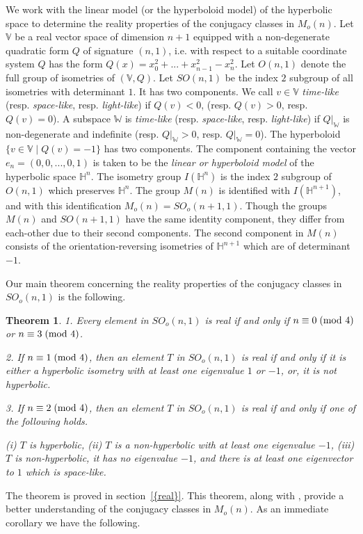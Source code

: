 \documentclass[11pt]{amsart}
\newtheorem{theorem}{Theorem}[section]
\theoremstyle{definition}
\theoremstyle{remark}
\numberwithin{equation}{section}
\theoremstyle{plain}
\begin{document}
We work with the linear model (or the hyperboloid model) of the hyperbolic space to determine the reality properties of the conjugacy classes in $M_o(n)$. Let ${\mathbb V}$ be a real vector space of dimension $n+1$ equipped with a non-degenerate quadratic form $Q$ of signature $(n,1)$, i.e. with respect to a suitable coordinate system $Q$ has the form {$Q(x)=x_0^2 +...+x_{n-1}^2-x_{n}^2$}.  Let $O(n,1)$ denote the full group of isometries of $({\mathbb V},Q)$. Let $SO(n,1)$ be the index $2$ subgroup of all isometries with determinant $1$. It has two components. We call  $v \in {\mathbb V}$ {\it time-like} (resp. {\it space-like}, resp. {\it light-like}) if
$Q(v) < 0$, (resp. $Q(v) >  0$, resp. $Q(v) = 0$). A subspace ${\mathbb W}$ is  {\it time-like} (resp. {\it space-like}, resp. {\it light-like}) if $Q|_{\mathbb W}$ is non-degenerate and   indefinite (resp. $Q|_{\mathbb W} > 0$, resp. $Q|_{\mathbb W} = 0$). The hyperboloid
$\{v\in {\mathbb V}\;|\; Q(v) = -1\}$ has two components. The component containing the vector 
$e_n=(0,0,...,0,1)$ is taken to be the \emph{ linear or hyperboloid model} of the hyperbolic space ${\mathbb H}^n$. The isometry group $I({\mathbb H}^n)$ is the index $2$ subgroup of $O(n,1)$ which preserves ${\mathbb H}^{n}$.   The group  $M(n)$ is identified with $I({\mathbb H}^{n+1})$, and with this identification $M_o(n)=SO_o(n+1,1)$.   Though the groups $M(n)$ and $SO(n+1,1)$ have the same identity component, they differ from each-other due to their second components. The second component in $M(n)$ consists of the orientation-reversing isometries of ${\mathbb H}^{n+1}$ which are of determinant $-1$.

    \medskip  Our main theorem concerning the reality properties of the conjugacy classes in $SO_o(n,1)$ 
 is the following. 
\begin{theorem}\label{realson1}
1. Every element in $SO_o(n,1)$ is real if and only if $n \equiv 0\;(\hbox{mod }4)$ or $n \equiv 3 \;(\hbox{mod }4)$. 

2. If $n \equiv 1 \;(\hbox{mod }4)$, then an element $T$ in $SO_o(n,1)$ is real if and only if it is either a hyperbolic isometry with at least one eigenvalue $1$ or $-1$,  or,  it is not hyperbolic. 

3.  If $n \equiv 2 \;(\hbox{mod }4)$, then an element $T$ in $SO_o(n,1)$ is real if and only if 
one of the following holds.

(i) $T$ is hyperbolic, (ii) $T$ is a non-hyperbolic with at least one eigenvalue $-1$, (iii) $T$ is non-hyperbolic, it has no eigenvalue $-1$, and there is at least one eigenvector to $1$ which is space-like. 
\end{theorem}
The theorem is proved in {section~\ref{{real}}}. This theorem, along with \cite[Theorem 1.2]{kg},  provide a better understanding of the conjugacy classes in $M_o(n)$. As an immediate corollary we have the following. 
\end{document}

